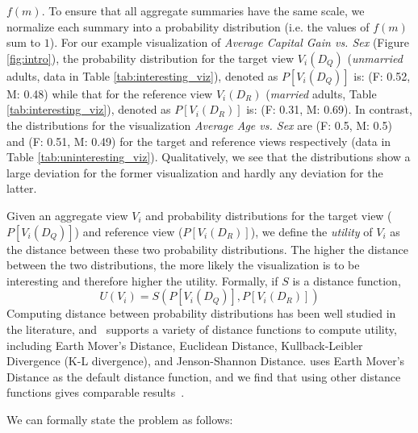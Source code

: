 $f(m)$. 
To ensure that all aggregate summaries have the same scale, we normalize each 
summary into a probability distribution (i.e. the values of $f(m)$ sum to $1$).
For our example visualization of {\em Average Capital Gain vs. Sex} (Figure \ref{fig:intro}),
the probability distribution for the target view $V_i(D_Q)$ ({\em unmarried} adults, data 
in Table \ref{tab:interesting_viz}), 
denoted as $P[V_i (D_Q)]$ is: 
(F: 0.52, M: 0.48) while that for the reference view $V_i(D_R)$ ({\em married} adults, Table \ref{tab:interesting_viz}), 
denoted as $P[V_i (D_R)]$ is:
(F: 0.31, M: 0.69). 
In contrast, the distributions for the visualization {\em Average Age
vs. Sex} are (F: 0.5, M: 0.5) and (F: 0.51, M: 0.49) 
for the target and reference views respectively (data 
in Table \ref{tab:uninteresting_viz}).
Qualitatively, we see that the distributions show a large deviation for
the former visualization and hardly any deviation for the latter.

Given an aggregate view $V_i$ and probability distributions for the
target view  ($P[V_i (D_Q)]$) and reference view ($P[V_i (D_R)]$), we
define the {\em utility} of $V_i$ as the distance between these two probability
distributions. The higher the distance between the two distributions, the more 
likely the
visualization is to be interesting and therefore higher the utility.
Formally, if $S$ is a distance function,
$$ U (V_i) = S ( P[V_i (D_Q)], P[V_i (D_R)] )$$
Computing distance between probability distributions has
been well studied in the literature, and \SeeDB\ supports a variety of distance
functions
to compute utility, including Earth Mover's Distance, 
Euclidean Distance, Kullback-Leibler Divergence (K-L
divergence), and Jenson-Shannon
Distance. 
\SeeDB uses Earth Mover's Distance as the default distance function,
and we find that using other distance functions gives comparable results~\cite{seedb-tr}.


We can formally state the \SeeDB problem as follows:

